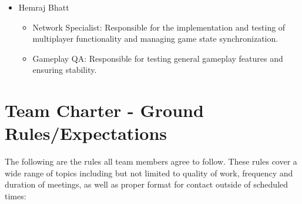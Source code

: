 \documentclass{article}
\begin{document}
\begin{itemize}
	\item Hemraj Bhatt
	\begin{itemize}
		\item Network Specialist: Responsible for the implementation and testing of multiplayer functionality and managing game state synchronization.
		\item Gameplay QA: Responsible for testing general gameplay features and ensuring stability.
	\end{itemize}	
	
\end{itemize}

\newpage
\section{Team Charter - Ground Rules/Expectations}

The following are the rules all team members agree to follow. These rules cover a wide range of topics including but not limited to quality of work, frequency and duration of meetings, as well as proper format for contact outside of scheduled times:
\end{document}
